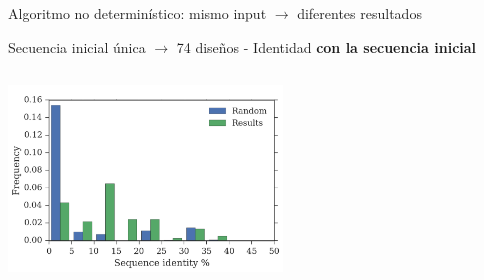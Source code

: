 \documentclass{beamer}
\begin{document}
\begin{frame}[plain]{{\small Algoritmo no determinístico: mismo input $\rightarrow$ diferentes resultados}}
\centering
\vspace{10px}
\begin{adjustwidth}{-2.5em}{-2.5em}
\begin{center}
\begin{adjustbox}{width=\textwidth}
Secuencia inicial única $\rightarrow$ 74 diseños - Identidad \textbf{con la secuencia inicial}
\end{adjustbox}
\end{center} 
\end{adjustwidth}
\hspace{10px}
\includegraphics[width=275px,height=215px]{../img/againstInitial-random.png}
\end{frame}




















\end{document}
